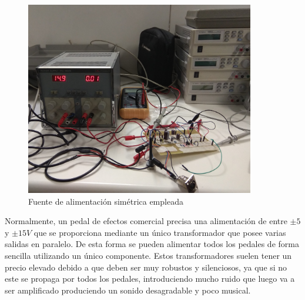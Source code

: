 \begin{figure}[!hbt]
\begin{center}
\includegraphics[width=10cm]{img/fuente.jpg}
\caption{\label{fig:fuente}Fuente de alimentación simétrica empleada}
\end{center}
\end{figure}

Normalmente, un pedal de efectos comercial precisa una alimentación de entre $\pm5$ y $\pm15V$ que se proporciona mediante un único transformador que posee varias salidas en paralelo. De esta forma se pueden alimentar todos los pedales de forma sencilla utilizando un único componente. Estos transformadores suelen tener un precio elevado debido a que deben ser muy robustos y silenciosos, ya que si no este se propaga por todos los pedales, introduciendo mucho ruido que luego va a ser amplificado produciendo un sonido desagradable y poco musical.


